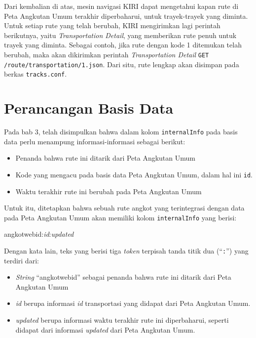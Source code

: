 Dari kembalian di atas, mesin navigasi KIRI dapat mengetahui kapan rute di Peta Angkutan Umum terakhir diperbaharui, untuk trayek-trayek yang diminta. Untuk setiap rute yang telah berubah, KIRI mengirimkan lagi perintah berikutnya, yaitu \textit{Transportation Detail}, yang memberikan rute penuh untuk trayek yang diminta. Sebagai contoh, jika rute dengan kode 1 ditemukan telah berubah, maka akan dikirimkan perintah \textit{Transportation Detail} \texttt{GET /route/transportation/1.json}. Dari situ, rute lengkap akan disimpan pada berkas \texttt{tracks.conf}.

\section{Perancangan Basis Data}

Pada bab 3, telah disimpulkan bahwa dalam kolom \texttt{internalInfo} pada basis data perlu menampung informasi-informasi sebagai berikut:

\begin{itemize}
	\item Penanda bahwa rute ini ditarik dari Peta Angkutan Umum
	\item Kode yang mengacu pada basis data Peta Angkutan Umum, dalam hal ini \texttt{id}.
	\item Waktu terakhir rute ini berubah pada Peta Angkutan Umum
\end{itemize}

Untuk itu, ditetapkan bahwa sebuah rute angkot yang terintegrasi dengan data pada Peta Angkutan Umum akan memiliki kolom \texttt{internalInfo} yang berisi:

\begin{center}
angkotwebid:\textit{id}:\textit{updated}
\end{center} 

Dengan kata lain, teks yang berisi tiga \textit{token} terpisah tanda titik dua (``\texttt{:}'') yang terdiri dari:

\begin{itemize}
	\item \textit{String} ``angkotwebid'' sebagai penanda bahwa rute ini ditarik dari Peta Angkutan Umum
	\item \textit{id} berupa informasi \textit{id} transportasi yang didapat dari Peta Angkutan Umum.
	\item \textit{updated} berupa informasi waktu terakhir rute ini diperbaharui, seperti didapat dari informasi \textit{updated} dari Peta Angkutan Umum.
\end{itemize}

